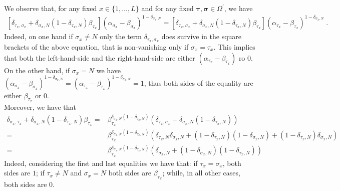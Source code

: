 \documentclass[10pt]{article}
\numberwithin{equation}{section}
\numberwithin{equation}{subsection}
\newcommand{\dt}{\;.}
\begin{document}
We observe that, for any fixed $x\in \{1,\ldots,L\}$ and for any fixed $\bm{\tau},\bm{\sigma}\in\Omega^{'}$, we have 
\begin{align}
	\left[\delta_{\tau_{x},\sigma_{x}}+\delta_{\sigma_{x},N}(1-\delta_{\tau_{x},N})\beta_{\tau_{x}}\right]\left(\alpha_{\sigma_{x}}-\beta_{\sigma_{x}}\right)^{1-\delta_{\sigma_{x},N}}=	\left[\delta_{\tau_{x},\sigma_{x}}+\delta_{\sigma_{x},N}(1-\delta_{\tau_{x},N})\beta_{\tau_{x}}\right]\left(\alpha_{\tau_{x}}-\beta_{\tau_{x}}\right)^{1-\delta_{\sigma_{x},N}}\dt
\end{align}
Indeed, on one hand if $\sigma_{x}\neq N$ only the term $\delta_{\tau_{x},\sigma_{x}}$ does survive in the square brackets of the above equation, that is non-vanishing only if $\sigma_{x}=\tau_{x}$. This implies that both the left-hand-side and the right-hand-side are either $(\alpha_{\tau_{x}}-\beta_{\tau_{x}})$ ro $0$. On the other hand, if $\sigma_{x}=N$ we have $(\alpha_{\sigma_{x}}-\beta_{\sigma_{x}})^{1-\delta_{\sigma_{x},N}}=(\alpha_{\tau_{x}}-\beta_{\tau_{x}})^{1-\delta_{\sigma_{x},N}}=1$, thus both sides of the equality are either $\beta_{\tau_{x}}$ or $0$.  \\
Moreover, we have that 
\begin{align}
	\delta_{\sigma_{x},\tau_{x}}+\delta_{\sigma_{x},N}(1-\delta_{\tau_{x},N})\beta_{\tau_{x}}=&\beta_{\tau_{x}}^{\delta_{\sigma_{x},N}(1-\delta_{\tau_{x},N})}\left(\delta_{\tau_{x},\sigma_{x}}+\delta_{\sigma_{x},N}(1-\delta_{\tau_{x},N})\right)\nonumber\\
	=&\beta_{\tau_{x}}^{\delta_{\sigma_{x},N}(1-\delta_{\tau_{x},N})}\left(\delta_{\tau_{x},N}\delta_{\sigma_{x},N}+(1-\delta_{\tau_{x},N})(1-\delta_{\sigma_{x},N})+(1-\delta_{\tau_{x},N})\delta_{\sigma_{x},N}\right)\nonumber\\
	=&\beta_{\tau_{x}}^{\delta_{\sigma_{x},N}(1-\delta_{\tau_{x},N})}\left(\delta_{\sigma_{x},N}+(1-\delta_{\sigma_{x},N})(1-\delta_{\tau_{x},N})\right)
\end{align}
Indeed, considering the first and last equalities we have that: if $\tau_{x}=\sigma_{x}$, both sides are $1$; if $\tau_{x}\neq N$ and $\sigma_{x}=N$ both sides are $\beta_{\tau_{x}}$; while, in all other cases, both sides are $0$. 
\end{document}
